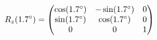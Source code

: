 \documentclass[preview]{standalone}
\begin{document}
\begin{align*}
\special{dvisvgm:raw <g id='unique000'>}R_z(1.7^\circ) = \begin{pmatrix} \cos(1.7^\circ) & -\sin(1.7^\circ) & 0 \\ \sin(1.7^\circ) & \cos(1.7^\circ) & 0 \\ 0 & 0 & 1 \end{pmatrix}\special{dvisvgm:raw </g>}
\end{align*}
\end{document}

